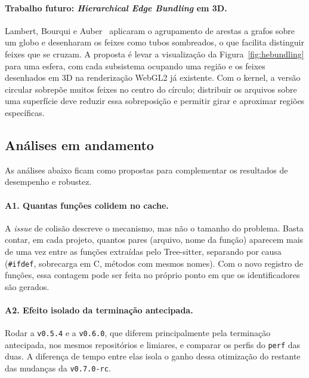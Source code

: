 \documentclass{article}
\newcommand{\cpp}{C\nolinebreak\hspace{-.05em}\raisebox{.4ex}{\relsize{-3}{\textbf{+}}}\nolinebreak\hspace{-.10em}\raisebox{.4ex}{\relsize{-3}{\textbf{+}}}}
\newcommand{\vnova}{\texttt{v0.7.0-rc}}
\begin{document}

\paragraph{Trabalho futuro: \textit{Hierarchical Edge Bundling} em 3D.} Lambert, Bourqui e Auber~\cite{lambert2010bundling3d} aplicaram o agrupamento de arestas a grafos sobre um globo e desenharam os feixes como tubos sombreados, o que facilita distinguir feixes que se cruzam. A proposta é levar a visualização da Figura~\ref{fig:hebundling} para uma esfera, com cada subsistema ocupando uma região e os feixes desenhados em 3D na renderização WebGL2 já existente. Com o kernel, a versão circular sobrepõe muitos feixes no centro do círculo; distribuir os arquivos sobre uma superfície deve reduzir essa sobreposição e permitir girar e aproximar regiões específicas.

\subsection{Análises em andamento}\label{sec:andamento}

As análises abaixo ficam como propostas para complementar os resultados de desempenho e robustez.

\paragraph{A1. Quantas funções colidem no cache.}
A \textit{issue} de colisão descreve o mecanismo, mas não o tamanho do problema. Basta contar, em cada projeto, quantos pares (arquivo, nome da função) aparecem mais de uma vez entre as funções extraídas pelo Tree-sitter, separando por causa (\texttt{\#ifdef}, sobrecarga em \cpp, métodos com mesmos nomes). Com o novo registro de funções, essa contagem pode ser feita no próprio ponto em que os identificadores são gerados.

\paragraph{A2. Efeito isolado da terminação antecipada.}
Rodar a \texttt{v0.5.4} e a \texttt{v0.6.0}, que diferem principalmente pela terminação antecipada, nos mesmos repositórios e limiares, e comparar os perfis do \texttt{perf} das duas. A diferença de tempo entre elas isola o ganho dessa otimização do restante das mudanças da \vnova{}.
\end{document}
